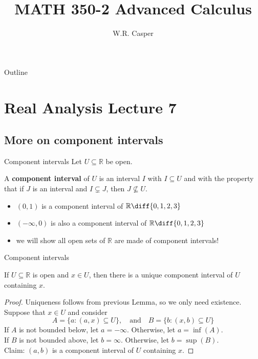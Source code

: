 \documentclass{beamer}
\title{MATH 350-2 Advanced Calculus}
\subtitle
{} %
\author[W.R. Casper] %
{W.R. Casper}
\institute[California State University Fullerton] %
{
  Department of Mathematics\\
  California State University Fullerton}
\begin{document}
\begin{frame}
  \titlepage
\end{frame}

\begin{frame}{Outline}
  \tableofcontents
\end{frame}



\section{Real Analysis Lecture 7}
\subsection{More on component intervals}

\begin{frame}{Component intervals}
Let $U\subseteq \mathbb{R}$ be open.
\pause
\begin{defn}
A \textbf{component interval} of $U$ is an interval $I$ with $I\subseteq U$ and with the property that if $J$ is an interval and $I\subsetneq J$, then $J\nsubseteq U$.
\end{defn}
\begin{itemize}
\pause
\item $(0,1)$ is a component interval of $\mathbb{R}\diff \{0,1,2,3\}$
\pause
\item $(-\infty,0)$ is also a component interval of $\mathbb{R}\diff \{0,1,2,3\}$
\pause
\item we will show all open sets of $\mathbb{R}$ are made of component intervals!
\end{itemize}
\end{frame}

\begin{frame}{Component intervals}
\begin{thm}[Apostol 3.10]
If $U\subseteq\mathbb{R}$ is open and $x\in U$, then there is a unique component interval of $U$ containing $x$.
\end{thm}
\pause
\begin{proof}
Uniqueness follows from previous Lemma, so we only need existence.\\
\pause
Suppose that $x\in U$ and consider
$$A = \{a: (a,x)\subseteq U\},\quad\text{and}\quad B = \{b: (x,b)\subseteq U\}$$
\pause
If $A$ is not bounded below, let $a=-\infty$.  Otherwise, let $a = \inf (A)$.\\
\pause
If $B$ is not bounded above, let $b=\infty$.  Otherwise, let $b = \sup (B)$.\\
\pause
Claim: $(a,b)$ is a component interval of $U$ containing $x$.
\end{proof}
\end{frame}
\end{document}
